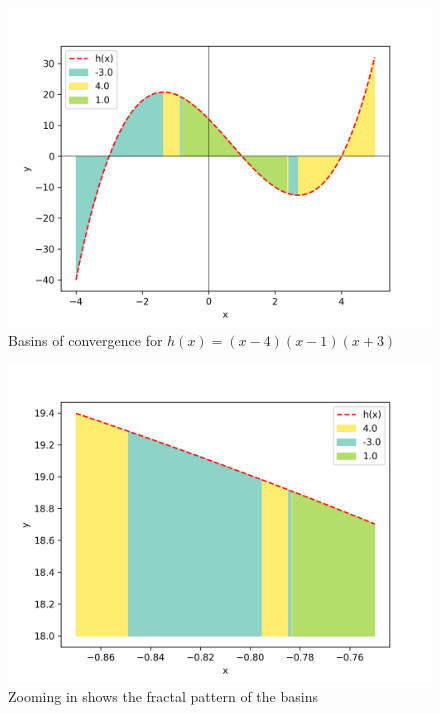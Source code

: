 \documentclass[10pt,a4paper]{article}
\begin{document}
		\begin{figure}[h]
			\caption{Basins of convergence for $h(x) = (x - 4)(x - 1)(x + 3)$}
			\includegraphics[scale=0.75]{figure2}
		\end{figure}
	
		\begin{figure}[h]
			\caption{Zooming in shows the fractal pattern of the basins}
			\includegraphics[scale=0.75]{figure3}
		\end{figure}
\end{document}
